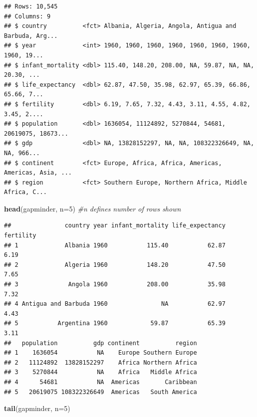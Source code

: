 \documentclass[
]{book}
\newenvironment{Shaded}{\begin{snugshade}}{\end{snugshade}}
\newcommand{\CommentTok}[1]{\textcolor[rgb]{0.56,0.35,0.01}{\textit{#1}}}
\newcommand{\DataTypeTok}[1]{\textcolor[rgb]{0.13,0.29,0.53}{#1}}
\newcommand{\DecValTok}[1]{\textcolor[rgb]{0.00,0.00,0.81}{#1}}
\newcommand{\KeywordTok}[1]{\textcolor[rgb]{0.13,0.29,0.53}{\textbf{#1}}}
\newcommand{\NormalTok}[1]{#1}
\begin{document}
\begin{verbatim}
## Rows: 10,545
## Columns: 9
## $ country          <fct> Albania, Algeria, Angola, Antigua and Barbuda, Arg...
## $ year             <int> 1960, 1960, 1960, 1960, 1960, 1960, 1960, 1960, 19...
## $ infant_mortality <dbl> 115.40, 148.20, 208.00, NA, 59.87, NA, NA, 20.30, ...
## $ life_expectancy  <dbl> 62.87, 47.50, 35.98, 62.97, 65.39, 66.86, 65.66, 7...
## $ fertility        <dbl> 6.19, 7.65, 7.32, 4.43, 3.11, 4.55, 4.82, 3.45, 2....
## $ population       <dbl> 1636054, 11124892, 5270844, 54681, 20619075, 18673...
## $ gdp              <dbl> NA, 13828152297, NA, NA, 108322326649, NA, NA, 966...
## $ continent        <fct> Europe, Africa, Africa, Americas, Americas, Asia, ...
## $ region           <fct> Southern Europe, Northern Africa, Middle Africa, C...
\end{verbatim}

\begin{Shaded}
\begin{Highlighting}[]
\KeywordTok{head}\NormalTok{(gapminder, }\DataTypeTok{n=}\DecValTok{5}\NormalTok{) }\CommentTok{#n defines number of rows shown}
\end{Highlighting}
\end{Shaded}

\begin{verbatim}
##               country year infant_mortality life_expectancy fertility
## 1             Albania 1960           115.40           62.87      6.19
## 2             Algeria 1960           148.20           47.50      7.65
## 3              Angola 1960           208.00           35.98      7.32
## 4 Antigua and Barbuda 1960               NA           62.97      4.43
## 5           Argentina 1960            59.87           65.39      3.11
##   population          gdp continent          region
## 1    1636054           NA    Europe Southern Europe
## 2   11124892  13828152297    Africa Northern Africa
## 3    5270844           NA    Africa   Middle Africa
## 4      54681           NA  Americas       Caribbean
## 5   20619075 108322326649  Americas   South America
\end{verbatim}

\begin{Shaded}
\begin{Highlighting}[]
\KeywordTok{tail}\NormalTok{(gapminder, }\DataTypeTok{n=}\DecValTok{5}\NormalTok{)}
\end{Highlighting}
\end{Shaded}
\end{document}
